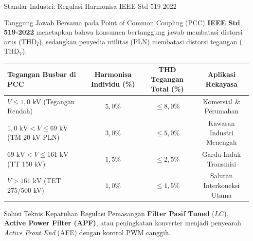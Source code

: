 \documentclass[aspectratio=169,10pt]{beamer}
\begin{document}
\begin{frame}{Standar Industri: Regulasi Harmonisa IEEE Std 519-2022}
  \begin{block}{Tanggung Jawab Bersama pada Point of Common Coupling (PCC)}
    \textbf{IEEE Std 519-2022} menetapkan bahwa konsumen bertanggung jawab membatasi distorsi arus ($\text{THD}_I$), sedangkan penyedia utilitas (PLN) membatasi distorsi tegangan ($\text{THD}_V$).
  \end{block}
  \vspace{0.1cm}
  \begin{table}[h]
    \centering
    \scriptsize
    \begin{tabular}{lccc}
      \toprule
      \textbf{Tegangan Busbar di PCC} & \textbf{Harmonisa Individu (\%)} & \textbf{THD Tegangan Total (\%)} & \textbf{Aplikasi Rekayasa} \\
      \midrule
      $V \le 1{,}0\text{ kV}$ (Tegangan Rendah) & $5{,}0\%$ & $\le 8{,}0\%$ & Komersial \& Perumahan \\
      $1{,}0\text{ kV} < V \le 69\text{ kV}$ (TM 20 kV PLN) & $3{,}0\%$ & $\le 5{,}0\%$ & Kawasan Industri Menengah \\
      $69\text{ kV} < V \le 161\text{ kV}$ (TT 150 kV) & $1{,}5\%$ & $\le 2{,}5\%$ & Gardu Induk Transmisi \\
      $V > 161\text{ kV}$ (TET 275/500 kV) & $1{,}0\%$ & $\le 1{,}5\%$ & Saluran Interkoneksi Utama \\
      \bottomrule
    \end{tabular}
  \end{table}
  \begin{exampleblock}{Solusi Teknis Kepatuhan Regulasi}
    Pemasangan \textbf{Filter Pasif Tuned} ($LC$), \textbf{Active Power Filter (APF)}, atau peningkatan konverter menjadi penyearah \textit{Active Front End} (AFE) dengan kontrol PWM canggih.
  \end{exampleblock}
\end{frame}
\end{document}
